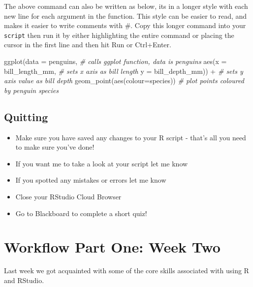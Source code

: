 \documentclass[
]{book}
\newenvironment{Shaded}{\begin{snugshade}}{\end{snugshade}}
\newcommand{\AttributeTok}[1]{\textcolor[rgb]{0.77,0.63,0.00}{#1}}
\newcommand{\CommentTok}[1]{\textcolor[rgb]{0.56,0.35,0.01}{\textit{#1}}}
\newcommand{\FunctionTok}[1]{\textcolor[rgb]{0.00,0.00,0.00}{#1}}
\newcommand{\NormalTok}[1]{#1}
\newcommand{\SpecialCharTok}[1]{\textcolor[rgb]{0.00,0.00,0.00}{#1}}
\begin{document}
The above command can also be written as below, its in a longer style with each new line for each argument in the function. This style can be easier to read, and makes it easier to write comments with \#. Copy this longer command into your \texttt{script} then run it by either highlighting the entire command or placing the cursor in the first line and then hit Run or Ctrl+Enter.

\begin{Shaded}
\begin{Highlighting}[]
\FunctionTok{ggplot}\NormalTok{(}\AttributeTok{data =}\NormalTok{ penguins, }\CommentTok{\# calls ggplot function, data is penguins}
       \FunctionTok{aes}\NormalTok{(}\AttributeTok{x =}\NormalTok{ bill\_length\_mm, }\CommentTok{\# sets x axis as bill length}
           \AttributeTok{y =}\NormalTok{ bill\_depth\_mm)) }\SpecialCharTok{+} \CommentTok{\# sets y axis value as bill depth}
    \FunctionTok{geom\_point}\NormalTok{(}\FunctionTok{aes}\NormalTok{(}\AttributeTok{colour=}\NormalTok{species)) }\CommentTok{\# plot points coloured by penguin species}
\end{Highlighting}
\end{Shaded}

\hypertarget{quitting}{%
\section{Quitting}\label{quitting}}

\begin{itemize}
\item
  Make sure you have saved any changes to your R script - that's all you need to make sure you've done!
\item
  If you want me to take a look at your script let me know
\item
  If you spotted any mistakes or errors let me know
\item
  Close your RStudio Cloud Browser
\item
  Go to Blackboard to complete a short quiz!
\end{itemize}

\hypertarget{workflow-part-one-week-two}{%
\chapter{Workflow Part One: Week Two}\label{workflow-part-one-week-two}}

Last week we got acquainted with some of the core skills associated with using R and RStudio.
\end{document}
